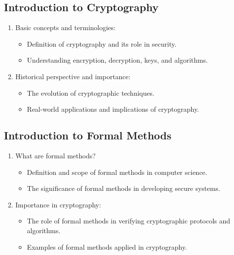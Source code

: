 \subsection{Introduction to Cryptography}
\begin{enumerate}
	\item Basic concepts and terminologies:
	\begin{itemize}
		\item Definition of cryptography and its role in security.
		\item Understanding encryption, decryption, keys, and algorithms.
	\end{itemize}
	\item Historical perspective and importance:
	\begin{itemize}
		\item The evolution of cryptographic techniques.
		\item Real-world applications and implications of cryptography.
	\end{itemize}
\end{enumerate}

\subsection{Introduction to Formal Methods}
\begin{enumerate}
	\item What are formal methods?
	\begin{itemize}
		\item Definition and scope of formal methods in computer science.
		\item The significance of formal methods in developing secure systems.
	\end{itemize}
	\item Importance in cryptography:
	\begin{itemize}
		\item The role of formal methods in verifying cryptographic protocols and algorithms.
		\item Examples of formal methods applied in cryptography.
	\end{itemize}
\end{enumerate}

